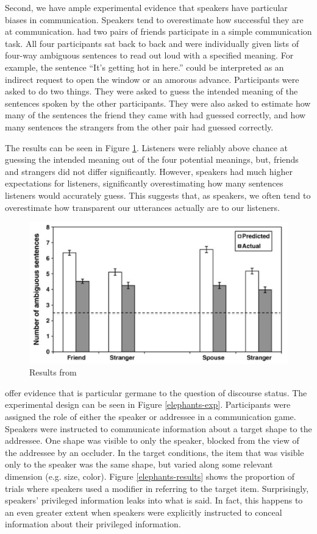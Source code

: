 Second, we have ample experimental evidence that speakers have particular biases in communication. Speakers tend to overestimate how successful they are at communication. \cite{savitsky-etal:2011} had two pairs of friends participate in a simple communication task. All four participants sat back to back and were individually given lists of four-way ambiguous sentences to read out loud with a specified meaning. For example, the sentence ``It's getting hot in here.'' could be interpreted as an indirect request to open the window or an amorous advance. Participants were asked to do two things. They were asked to guess the intended meaning of the sentences spoken by the other participants. They were also asked to estimate how many of the sentences the friend they came with had guessed correctly, and how many sentences the strangers from the other pair had guessed correctly. 

The results can be seen in Figure \ref{savitsky}. Listeners were reliably above chance at guessing the intended meaning out of the four potential meanings, but, friends and strangers did not differ significantly. However, speakers had much higher expectations  for listeners, significantly overestimating how many sentences listeners would accurately guess. This suggests that, as speakers, we often tend to overestimate how transparent our utterances actually are to our listeners.


\begin{figure}
\begin{center}
\includegraphics[width=.7\textwidth]{savitsky.pdf}          
\end{center}
  \caption{Results from \cite{savitsky-etal:2011}}
   \label{savitsky}
\end{figure}


\cite{lane-etal2006} offer evidence that is particular germane to the question of discourse status. The experimental design can be seen in Figure \ref{elephants-exp}. Participants were assigned the role of either the speaker or addressee in a communication game. Speakers were instructed to communicate information about a target shape to the addressee. One shape was visible to only the speaker, blocked from the view of the addressee by an occluder. In the target conditions, the item that was visible only to the speaker was the same shape, but varied along some relevant dimension (e.g. size, color). Figure \ref{elephants-results} shows the proportion of trials where speakers used a modifier in referring to the target item. Surprisingly, speakers' privileged information leaks into what is said. In fact, this happens to an even greater extent when speakers were explicitly instructed to conceal information about their privileged information.


